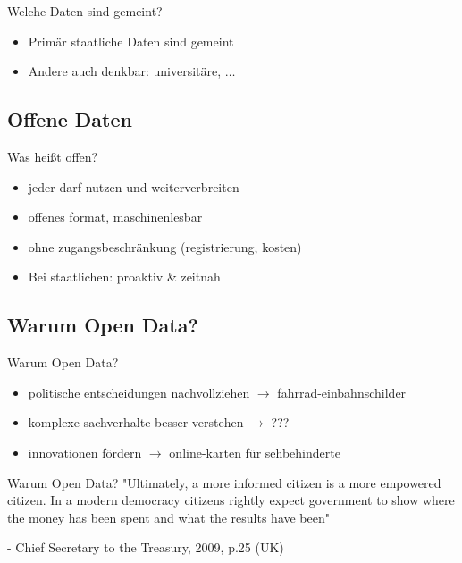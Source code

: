 \begin{frame}[t]{Welche Daten sind gemeint?}
 \begin{block}{}
 \begin{itemize}
  \item Primär staatliche Daten sind gemeint
  \item Andere auch denkbar: universitäre, $\dots$ 
 \end{itemize}
 \end{block}
\end{frame}



\subsection{Offene Daten}
\begin{frame}[t]{Was heißt offen?}
 \begin{itemize}
   \item jeder darf nutzen und weiterverbreiten
   \item offenes format, maschinenlesbar
   \item ohne zugangsbeschränkung (registrierung, kosten)
   \item Bei staatlichen: proaktiv \& zeitnah
 \end{itemize}
\end{frame}

\subsection{Warum Open Data?}
\begin{frame}[t]{Warum Open Data?}
 \begin{itemize}
  \item politische entscheidungen nachvollziehen $\rightarrow$ fahrrad-einbahnschilder
  \item komplexe sachverhalte besser verstehen $\rightarrow$ ???
  \item innovationen fördern $\rightarrow$ online-karten für sehbehinderte
 \end{itemize}
\end{frame}

\begin{frame}{Warum Open Data?}
 "Ultimately, a more informed citizen is a more empowered citizen. In a modern democracy citizens rightly expect government to show where the money has been spent and what the results have been"
 
 - Chief Secretary to the Treasury, 2009, p.25 (UK)
\end{frame}